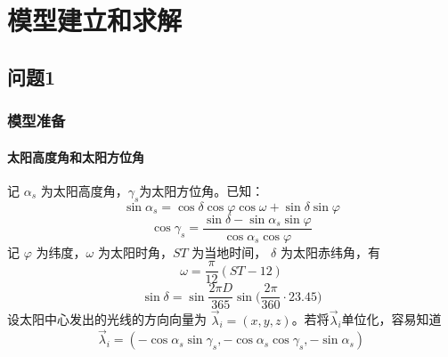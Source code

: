 \documentclass[../main.tex]{subfiles}
\begin{document}
\section{模型建立和求解}
\subsection{问题1}
\subsubsection{模型准备}
\paragraph{太阳高度角和太阳方位角}
记 \(\alpha _{s}\) 为太阳高度角，\(\gamma _{s}\)为太阳方位角。已知：
\begin{equation}
\sin \alpha _{s} = \cos \delta \cos \varphi \cos \omega + \sin \delta \sin \varphi
\end{equation}
\begin{equation}
\cos \gamma _{s} = \frac{\sin \delta -\sin \alpha_{s} \sin \varphi}{\cos \alpha _{s} \cos \varphi}
\end{equation}
记 \( \varphi\) 为纬度，\(\omega\) 为太阳时角，\(ST\) 为当地时间， \(\delta\) 为太阳赤纬角，有
\begin{equation}
\omega = \frac{\pi}{12} ( ST - 12)
\end{equation}
\begin{equation}
\sin \delta = \sin \frac{2 \pi D}{365} \sin \big(\frac{2\pi}{360} \cdot 23.45\big)
\end{equation}
设太阳中心发出的光线的方向向量为 \(\vec\lambda _{i} = (x,  y , z)\)。若将\(\vec \lambda_{i}\)单位化，容易知道
\begin{equation}
\vec \lambda _{i} = ({-} \cos \alpha _{s} \sin \gamma_{s} ,{-} \cos \alpha_{s} \cos \gamma_{s}, {-} \sin \alpha_{s})
\end{equation}
\end{document}
